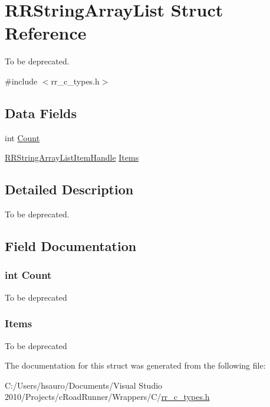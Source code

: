 \hypertarget{struct_r_r_string_array_list}{
\section{\-R\-R\-String\-Array\-List \-Struct \-Reference}
\label{struct_r_r_string_array_list}
}


\-To be deprecated.  




{\ttfamily \#include $<$rr\-\_\-c\-\_\-types.\-h$>$}

\subsection*{\-Data \-Fields}
\begin{DoxyCompactItemize}
\item 
int \hyperlink{struct_r_r_string_array_list_aad462966ed963f892117056de1eba502}{\-Count}
\item 
\hyperlink{rr__c__types_8h_a0f26974a8843e83ce00c013648e3a0e4}{\-R\-R\-String\-Array\-List\-Item\-Handle} \hyperlink{struct_r_r_string_array_list_a0ef0ac4d72f04a061dc23decb55cb2ae}{\-Items}
\end{DoxyCompactItemize}


\subsection{\-Detailed \-Description}
\-To be deprecated. 

\subsection{\-Field \-Documentation}
\hypertarget{struct_r_r_string_array_list_aad462966ed963f892117056de1eba502}{
\subsubsection[{\-Count}]{\setlength{\rightskip}{0pt plus 5cm}int {\bf \-Count}}}
\label{struct_r_r_string_array_list_aad462966ed963f892117056de1eba502}
\-To be deprecated \hypertarget{struct_r_r_string_array_list_a0ef0ac4d72f04a061dc23decb55cb2ae}{
\subsubsection[{\-Items}]{ {\bf \-Items}}}
\label{struct_r_r_string_array_list_a0ef0ac4d72f04a061dc23decb55cb2ae}
\-To be deprecated 

\-The documentation for this struct was generated from the following file\-:\begin{DoxyCompactItemize}
\item 
\-C\-:/\-Users/hsauro/\-Documents/\-Visual Studio 2010/\-Projects/c\-Road\-Runner/\-Wrappers/\-C/\hyperlink{rr__c__types_8h}{rr\-\_\-c\-\_\-types.\-h}\end{DoxyCompactItemize}

